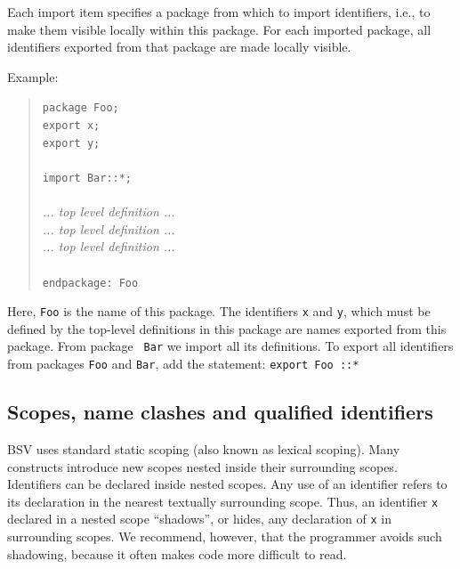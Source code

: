 \documentclass[twoside,letterpaper]{article}
\newcommand{\hm}{\hspace*{1em}}
\newcommand{\BSV}{BSV}
\newcommand{\te}[1]{\texttt{#1}}
\begin{document}
Each import item specifies a package from which to import identifiers,
i.e., to make them visible locally within this package.  For each
imported package, all identifiers exported from that package are made
locally visible.

Example:
\begin{quote}
\texttt{package Foo;} \\
\texttt{export x;} \\
\texttt{export y;} \\
\hm \\
\texttt{import Bar::*;} \\
\hm \\
{\rm\emph{... top level definition ...}} \\
{\rm\emph{... top level definition ...}} \\
{\rm\emph{... top level definition ...}} \\
\hm \\
\texttt{endpackage: Foo}
\end{quote}

Here, \texttt{Foo} is the name of this package. The identifiers \texttt{x}
and \texttt{y}, which must be defined by the top-level definitions in
this package are names exported from this package.  From package {\tt
Bar} we import all its definitions.    To export all identifiers from
 packages \te{Foo} and \te{Bar}, add the statement: \te{export Foo ::*}


\subsection{Scopes, name clashes and qualified identifiers}

\label{sec-scopes}

{\BSV} uses standard static scoping (also known as lexical scoping).
Many constructs introduce new scopes nested inside their surrounding
scopes.  Identifiers can be declared inside nested scopes.  Any use of
an identifier refers to its declaration in the nearest textually
surrounding scope.  Thus, an identifier \texttt{x} declared in a nested
scope ``shadows'', or hides, any declaration of \texttt{x} in surrounding
scopes.  We recommend, however, that the programmer avoids such
shadowing, because it often makes code more difficult to read.
\end{document}
